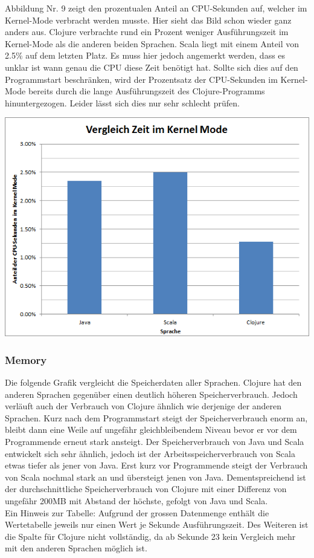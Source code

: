 \documentclass{fancydocument}
\begin{document}
Abbildung Nr. 9 zeigt den prozentualen Anteil an CPU-Sekunden auf, welcher im Kernel-Mode verbracht werden musste. Hier sieht das Bild schon wieder ganz anders aus. Clojure verbrachte rund ein Prozent weniger Ausführungszeit im Kernel-Mode als die anderen beiden Sprachen. Scala liegt mit einem Anteil von 2.5\% auf dem letzten Platz. Es muss hier jedoch angemerkt werden, dass es unklar ist wann genau die CPU diese Zeit benötigt hat. Sollte sich dies auf den Programmstart beschränken, wird der Prozentsatz der CPU-Sekunden im Kernel-Mode bereits durch die lange Ausführungszeit des Clojure-Programms hinuntergezogen. Leider lässt sich dies nur sehr schlecht prüfen.
\begin{center}
\includegraphics[width=\linewidth]{bilder/KernelModeAll.png}
\end{center}

\subsubsection{Memory}
Die folgende Grafik vergleicht die Speicherdaten aller Sprachen. Clojure hat den anderen Sprachen gegenüber einen deutlich höheren Speicherverbrauch. Jedoch verläuft auch der Verbrauch von Clojure  ähnlich wie derjenige der anderen Sprachen. Kurz nach dem Programmstart steigt der Speicherverbrauch enorm an, bleibt dann eine Weile auf ungefähr gleichbleibendem Niveau bevor er vor dem Programmende erneut stark ansteigt. Der Speicherverbrauch von Java und Scala entwickelt sich sehr ähnlich, jedoch ist der Arbeitsspeicherverbrauch von Scala etwas tiefer als jener von Java. Erst kurz vor Programmende steigt der Verbrauch von Scala nochmal stark an und übersteigt jenen von Java. Dementspreichend ist der durchschnittliche Speicherverbrauch von Clojure mit einer Differenz von ungefähr 200MB mit Abstand der höchste, gefolgt von Java und Scala.
\\
\bigskip
\noindent
Ein Hinweis zur Tabelle: Aufgrund der grossen Datenmenge enthält die Wertetabelle jeweils nur einen Wert je Sekunde Ausführungszeit. Des Weiteren ist die Spalte für Clojure nicht vollständig, da ab Sekunde 23 kein Vergleich mehr mit den anderen Sprachen möglich ist.
\end{document}
